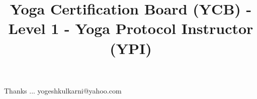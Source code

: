 \documentclass[xcolor=dvipsnames,compress,t,pdf,9pt]{beamer}
\title[\insertframenumber /\inserttotalframenumber]{Yoga Certification Board (YCB) - Level 1 - Yoga Protocol Instructor (YPI)}
\begin{document}
	\begin{frame}
	\titlepage
	\end{frame}
	
	
	
	\begin{frame}[c]{}
	Thanks ...
	\vspace{5mm}
	yogeshkulkarni@yahoo.com
	\end{frame}
\end{document}
